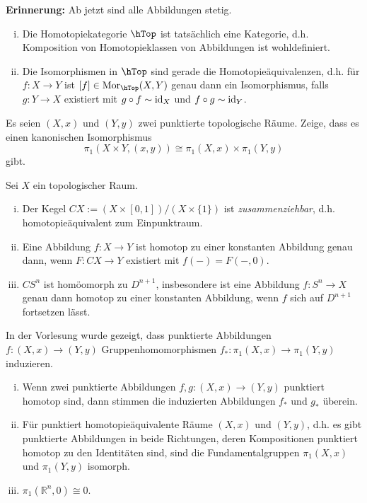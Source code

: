 \textbf{Erinnerung:} Ab jetzt sind alle Abbildungen stetig.
\begin{aufgabe}
	\begin{enumerate}[i)]
		\item Die Homotopiekategorie $\hTop$ ist tatsächlich eine Kategorie, d.h. Komposition von Homotopieklassen von Abbildungen ist wohldefiniert.
		\item Die Isomorphismen in $\hTop$ sind gerade die Homotopieäquivalenzen, d.h. für $f\colon X\to Y$ ist $[f]\in\Mor_{\hTop}(X,Y)$ genau dann ein Isomorphismus, falls $g\colon Y\to X$ existiert mit $g\circ f\sim \mathrm{id}_X$ und $f\circ g\sim \mathrm{id}_Y$.
	\end{enumerate}	
\end{aufgabe}

\begin{aufgabe}
	Es seien $(X,x)$ und $(Y,y)$ zwei punktierte topologische Räume. Zeige, dass es einen kanonischen Isomorphismus 
	\[ \pi_1(X\times Y, (x,y)) \cong \pi_1(X,x) \times \pi_1(Y,y) \]
	gibt.
\end{aufgabe}

\begin{aufgabe} Sei $X$ ein topologischer Raum.
	\begin{enumerate}[i)]
		\item Der Kegel $CX:=(X\times[0,1])/(X\times\{1\})$ ist \emph{zusammenziehbar}, d.h. homotopieäquivalent zum Einpunktraum.
		\item Eine Abbildung $f\colon X\to Y$ ist homotop zu einer konstanten Abbildung genau dann, wenn $F\colon CX\to Y$ existiert mit $f(-)=F(-,0)$.
		\item $CS^{n}$ ist homöomorph zu $D^{n+1}$, insbesondere ist eine Abbildung $f\colon S^n\to X$ genau dann homotop zu einer konstanten Abbildung, wenn $f$ sich auf $D^{n+1}$ fortsetzen lässt.
	\end{enumerate}
\end{aufgabe}

\begin{aufgabe}
	In der Vorlesung wurde gezeigt, dass punktierte Abbildungen $f\colon (X,x)\to (Y,y)$ Gruppenhomomorphismen $f_*\colon \pi_1(X,x)\to \pi_1(Y,y)$ induzieren. 
	\begin{enumerate}[i)]
		\item Wenn zwei punktierte Abbildungen $f, g\colon (X,x) \to (Y,y)$ punktiert homotop sind, dann stimmen die induzierten Abbildungen $f_*$ und $g_*$ überein.
		\item Für punktiert homotopieäquivalente Räume $(X,x)$ und $(Y,y)$, d.h. es gibt punktierte Abbildungen in beide Richtungen, deren Kompositionen punktiert homotop zu den Identitäten sind, sind die Fundamentalgruppen $\pi_1(X,x)$ und $\pi_1(Y,y)$ isomorph.
		\item $\pi_1(\mathbb R^n, 0) \cong 0$.
	\end{enumerate}
\end{aufgabe}
